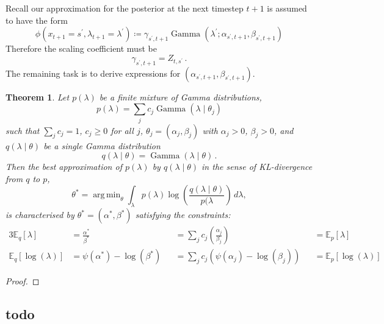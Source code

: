 \documentclass[twoside, 11pt]{article}
\DeclareMathOperator*{\argmin}{arg\,min}
\DeclareMathOperator*{\gammad}{Gamma}
\newcommand{\E}[0] {\mathbb{E}} %
\newtheorem{thm}{Theorem}
\begin{document}
Recall our approximation for the posterior at the next timestep $t+1$ is assumed to have the form
\begin{equation}
\phi(x_{t+1}=s^{\prime}, \lambda_{t+1}=\lambda^{\prime}) \coloneqq \gamma_{s^{\prime},t+1} \gammad(\lambda^{\prime} ; \alpha_{s^{\prime},t+1}, \beta_{s^{\prime},t+1})
\end{equation}
Therefore the scaling coefficient must be
\begin{equation}
\gamma_{s^{\prime},t+1} = Z_{t,s^{\prime}} \, .
\end{equation}
The remaining task is to derive expressions for $(\alpha_{s^{\prime},t+1}, \beta_{s^{\prime},t+1})$.

\begin{thm}
Let $p(\lambda)$ be a finite mixture of Gamma distributions,
\begin{equation}
p(\lambda) = \sum_j c_j \gammad(\lambda \mid \theta_j)
\end{equation}
such that $\sum_j c_j = 1$, $c_j \geq 0$ for all $j$, $\theta_j = (\alpha_j, \beta_j)$ with $\alpha_j > 0$, $\beta_j > 0$, and $q(\lambda \mid \theta)$ be a single Gamma distribution
\begin{equation}
q(\lambda \mid \theta ) = \gammad(\lambda \mid \theta) \, .
\end{equation}
Then the best approximation of $p(\lambda)$ by $q(\lambda \mid \theta)$ in the sense of KL-divergence from $q$ to $p$,
\begin{equation}
\theta^{*} = \argmin_{\theta} \int_{\lambda} p(\lambda) \log \left( \frac{q(\lambda \mid \theta) }{ p(\lambda } \right) \, d\lambda ,
\end{equation}
is characterised by $\theta^* = (\alpha^*, \beta^*)$ satisfying the constraints:
\begin{alignat}{3}
\E_q \left[ \lambda \right]
& = \frac{\alpha^*}{\beta^*}
&& = \sum_j c_j \left( \frac{\alpha_j}{\beta_j} \right)
&& = \E_p \left[ \lambda \right] \\
\E_q \left[ \log(\lambda) \right]
& = \psi(\alpha^*) - \log(\beta^*)
&& = \sum_j c_j \left( \psi(\alpha_j) - \log(\beta_j) \right)
&& = \E_p \left[ \log(\lambda) \right]
\end{alignat}

\end{thm}
\begin{proof}
\end{proof}



\subsection{todo}
\end{document}
